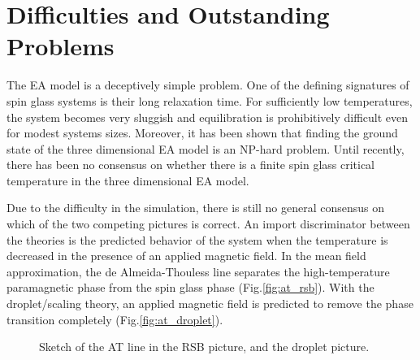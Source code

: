 \section{Difficulties and Outstanding Problems}
The EA model is a deceptively simple problem. %
One of the defining signatures of spin glass systems is their long relaxation 
time. 
For sufficiently low temperatures, the system becomes very sluggish and 
equilibration is prohibitively difficult even for modest systems sizes. 
Moreover, it has been shown that finding the ground state of the three 
dimensional EA model is an NP-hard problem. \cite{Barahona-1982} 
Until recently, there has been no consensus on whether there is a finite spin 
glass critical temperature in the three dimensional EA model.


Due to the difficulty in the simulation, there is still no general consensus on
which of the two competing pictures is correct. 
An import discriminator between the theories is the predicted behavior of 
the system when the temperature is decreased in the presence of an applied magnetic
field. 
In the mean field approximation, the de Almeida-Thouless line separates the 
high-temperature paramagnetic phase from the spin glass phase (Fig.\ref{fig:at_rsb}). 
With the droplet/scaling theory, an applied magnetic field is predicted to remove
the phase transition completely (Fig.\ref{fig:at_droplet}).

\begin{figure}
  \centering
  \hspace{0.5cm}
  \caption{Sketch of the AT line in the RSB picture, and the droplet picture.}
  \label{fig:at_line}
\end{figure}

